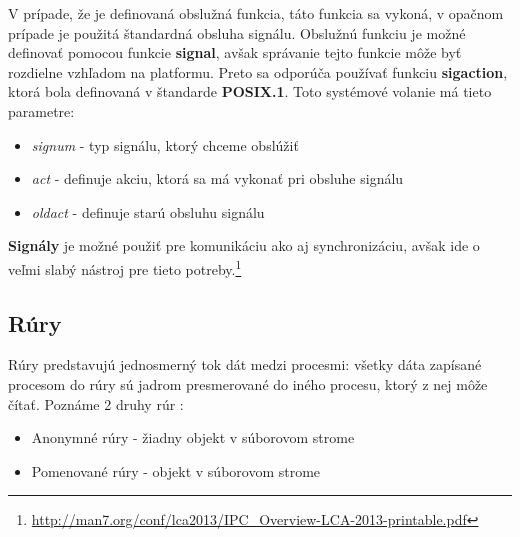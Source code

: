 V prípade, že je definovaná obslužná funkcia, táto funkcia sa vykoná, v opačnom prípade je použitá štandardná obsluha signálu. Obslužnú funkciu je možné definovať pomocou funkcie \textbf{signal}, avšak správanie tejto funkcie môže byť rozdielne vzhľadom na platformu. Preto sa odporúča používať funkciu \textbf{sigaction}, ktorá bola definovaná v štandarde \textbf{POSIX.1}. Toto systémové volanie má tieto parametre\cite{sigaction}:
\begin{itemize}
\item \textit{signum} - typ signálu, ktorý chceme obslúžiť
\item \textit{act} - definuje akciu, ktorá sa má vykonať pri obsluhe signálu
\item \textit{oldact} - definuje starú obsluhu signálu
\end{itemize}

\textbf{Signály} je možné použiť pre komunikáciu ako aj synchronizáciu, avšak ide o veľmi slabý nástroj pre tieto potreby.\footnote{\url{http://man7.org/conf/lca2013/IPC_Overview-LCA-2013-printable.pdf}}
\subsection{Rúry}
Rúry predstavujú jednosmerný tok dát medzi procesmi: všetky dáta zapísané procesom do rúry sú jadrom   presmerované do iného procesu, ktorý z nej môže čítať. Poznáme 2 druhy rúr \cite{linux}:
\begin{itemize}
\item Anonymné rúry - žiadny objekt v súborovom strome
\item Pomenované rúry - objekt v súborovom strome
\end{itemize}
